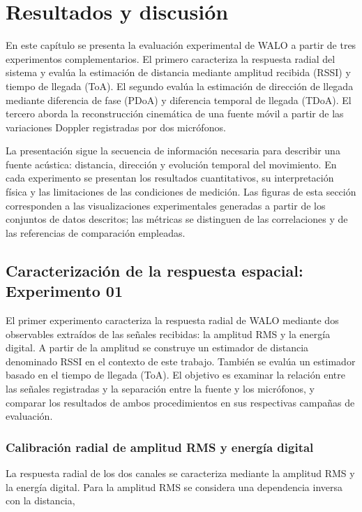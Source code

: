 \chapter{Resultados y discusión}
\label{chap:resultados_discusion}

En este capítulo se presenta la evaluación experimental de WALO a
partir de tres experimentos complementarios. El primero caracteriza
la respuesta radial del sistema y evalúa la estimación de distancia
mediante amplitud recibida (RSSI) y tiempo de llegada (ToA). El
segundo evalúa la estimación de dirección de llegada mediante
diferencia de fase (PDoA) y diferencia temporal de llegada (TDoA).
El tercero aborda la reconstrucción cinemática de una fuente móvil
a partir de las variaciones Doppler registradas por dos micrófonos.

La presentación sigue la secuencia de información necesaria para
describir una fuente acústica: distancia, dirección y evolución
temporal del movimiento. En cada experimento se presentan los
resultados cuantitativos, su interpretación física y las limitaciones
de las condiciones de medición. Las figuras de esta sección
corresponden a las visualizaciones experimentales generadas a partir
de los conjuntos de datos descritos; las métricas se distinguen de
las correlaciones y de las referencias de comparación empleadas.

\section{Caracterización de la respuesta espacial: Experimento 01}
\label{sec:exp01}

El primer experimento caracteriza la respuesta radial de WALO
mediante dos observables extraídos de las señales recibidas:
la amplitud RMS y la energía digital. A partir de la amplitud
se construye un estimador de distancia denominado RSSI en el
contexto de este trabajo. También se evalúa un estimador basado
en el tiempo de llegada (ToA). El objetivo es examinar la relación
entre las señales registradas y la separación entre la fuente y
los micrófonos, y comparar los resultados de ambos procedimientos
en sus respectivas campañas de evaluación.

\subsection{Calibración radial de amplitud RMS y energía digital}
\label{subsec:exp01_amplitude}

La respuesta radial de los dos canales se caracteriza mediante
la amplitud RMS y la energía digital. Para la amplitud RMS se
considera una dependencia inversa con la distancia,

